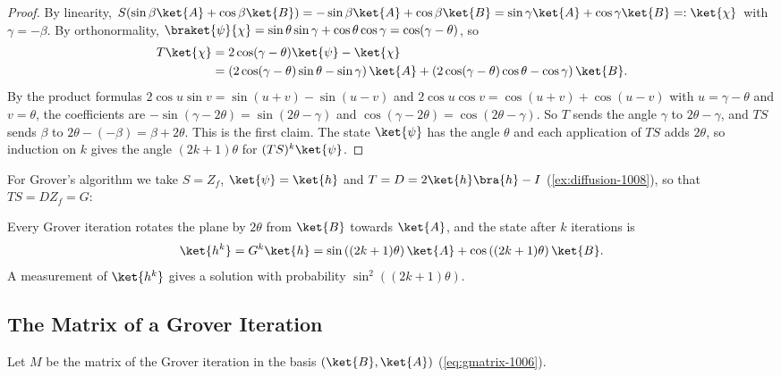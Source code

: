 \begin{proof}
    By linearity, $S(\sin\beta \ket{A} + \cos\beta \ket{B}) = -\sin\beta \ket{A} + \cos\beta \ket{B}
        = \sin\gamma \ket{A} + \cos\gamma \ket{B} =: \ket{\chi}$ with $\gamma = -\beta$. By orthonormality,
    $\braket{\psi}{\chi} = \sin\theta\sin\gamma + \cos\theta\cos\gamma = \cos(\gamma - \theta)$, so
    \begin{align*}
        T\ket{\chi} & = 2\cos(\gamma - \theta)\ket{\psi} - \ket{\chi}                                     \\
                    & = \left(2\cos(\gamma - \theta)\sin\theta - \sin\gamma\right)\ket{A}
        + \left(2\cos(\gamma - \theta)\cos\theta - \cos\gamma\right)\ket{B}.
    \end{align*}
    By the product formulas $2\cos u \sin v = \sin(u + v) - \sin(u - v)$ and
    $2\cos u \cos v = \cos(u + v) + \cos(u - v)$ with $u = \gamma - \theta$ and $v = \theta$, the
    coefficients are $-\sin(\gamma - 2\theta) = \sin(2\theta - \gamma)$ and
    $\cos(\gamma - 2\theta) = \cos(2\theta - \gamma)$. So $T$ sends the angle $\gamma$ to
    $2\theta - \gamma$, and $TS$ sends $\beta$ to $2\theta - (-\beta) = \beta + 2\theta$. This is the
    first claim. The state $\ket{\psi}$ has the angle $\theta$ and each application of $TS$ adds
    $2\theta$, so induction on $k$ gives the angle $(2k+1)\theta$ for $(TS)^k\ket{\psi}$.
\end{proof}

For Grover's algorithm we take $S = Z_f$, $\ket{\psi} = \ket{h}$ and $T = D = 2\ket{h}\bra{h} - I$
(\cref{ex:diffusion-1008}), so that $TS = D Z_f = G$:

\begin{corollary}\label{cor:hk-1008}
    Every Grover iteration rotates the plane by $2\theta$ from $\ket{B}$ towards $\ket{A}$, and the
    state after $k$ iterations is
    \[\ket{h^k} = G^k\ket{h} = \sin\left((2k+1)\theta\right) \ket{A} + \cos\left((2k+1)\theta\right) \ket{B}.\]
    A measurement of $\ket{h^k}$ gives a solution with probability $\sin^2\left((2k+1)\theta\right)$.
\end{corollary}

\subsection{The Matrix of a Grover Iteration}

Let $M$ be the matrix of the Grover iteration in the basis $(\ket{B}, \ket{A})$
(\cref{eq:gmatrix-1006}).

